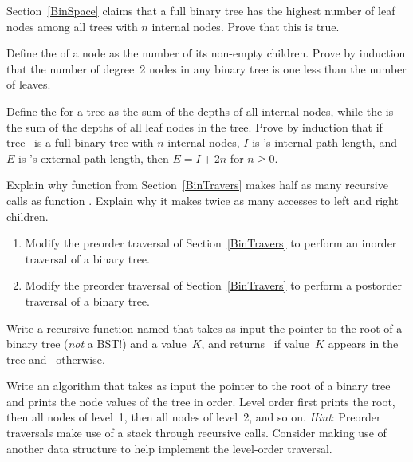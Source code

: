 \begin{exercises}

\item
Section~\ref{BinSpace} claims that a full binary tree has the highest
number of leaf nodes among all trees with \(n\)
internal nodes.
Prove that this is true.

\item
Define the  of a node as the number of its non-empty
children.
Prove by induction that the number of degree~2 nodes in any binary
tree is one less than the number of
leaves.

\item
Define the  for a tree as the sum of the
depths of all internal nodes, while the 
is the sum of the depths of all leaf nodes in the tree.
Prove by induction that if tree~ is a full
binary tree with \(n\) internal nodes, \(I\) is 's internal path
length, and \(E\) is 's external path length, then \(E = I + 2n\)
for \(n \geq 0\).

\item
Explain why function  from Section~\ref{BinTravers}
makes half as many recursive calls as function .
Explain why it makes twice as many accesses to left and right children.

\item
\begin{enumerate}

\item
Modify the preorder traversal of Section~\ref{BinTravers} to
perform an inorder traversal of a binary
tree.

\item
Modify the preorder traversal of Section~\ref{BinTravers} to
perform a post\-order traversal of a binary
tree.
\end{enumerate}

\item
Write a recursive function named  that
takes as input the pointer to the root of a  binary tree
(\emph{not} a BST!) and a value~\(K\), and returns \TRUE\ 
if value~\(K\) appears in the tree and \FALSE\ otherwise.

\item
Write an algorithm that takes as input the pointer to the root of a
binary tree and prints the node values of the tree in
 order.
Level order first prints the root, then all nodes of level~1, then all
nodes of level~2, and so on.
\emph{Hint}: Preorder traversals make use of a stack
through recursive\index{recursion} calls.
Consider making use of another data structure
to help implement the level-order traversal.


\end{exercises}
